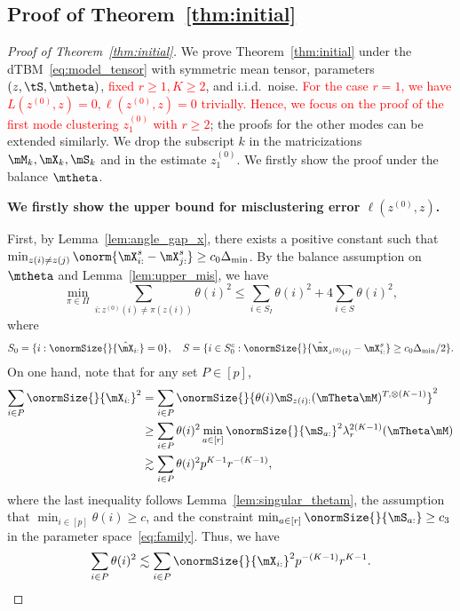 \documentclass[lettersize,onecolumn,journal]{IEEEtran}
\theoremstyle{definition}
\theoremstyle{definition}
\begin{document}
\subsection{Proof of Theorem~\ref{thm:initial}}
\begin{proof}[Proof of Theorem~\ref{thm:initial}] We prove Theorem~\ref{thm:initial} under the dTBM~\eqref{eq:model_tensor} with symmetric mean tensor, parameters $(z, \tS, \mtheta)$, \textcolor{red}{fixed $r\geq 1, K \geq 2$}, and i.i.d.\ noise. \textcolor{red}{For the case $r = 1$, we have $L(z^{(0)},z) = 0, \ell(z^{(0)}, z) = 0$ trivially. Hence, we focus on the proof of the first mode clustering $z^{(0)}_1$ with $r \geq 2$}; the proofs for the other modes can be extended similarly. We drop the subscript $k$ in the matricizations $\mM_k, \mX_k, \mS_k$ and in the estimate $z^{(0)}_1$. We firstly show the proof under the balance $\mtheta$.

\textbf{We firstly show the upper bound for misclustering error $\ell(z^{(0)}, z)$.}

First, by Lemma~\ref{lem:angle_gap_x}, there exists a positive constant such that $\min_{z(i) \neq z(j)} \onorm{ \mX^s_{i:} - \mX^s_{j:} } \geq c_0  \Delta_{\min}$. By the balance assumption on $\mtheta$ and Lemma~\ref{lem:upper_mis}, we have 
 \begin{equation}\label{eq:theta_bound}
          \min_{\pi \in \Pi} \sum_{i : z^{(0)}(i) \neq \pi(z(i))} \theta(i)^2  \leq  \sum_{i \in S_I} \theta(i)^2 + 4 \sum_{i \in S} \theta(i)^2 ,
    \end{equation}
    where 
    \begin{equation}
        S_0 = \{i: \onormSize{}{\hat \mX_{i:}} = 0\}, \quad S = \{i \in S_0^c: \onormSize{}{\hat \mx_{z^{(0)}(i)} - \mX_{i:}^s } \geq c_0  \Delta_{\min}/2\}.
    \end{equation}
    On one hand, note that for any set $P \in [p]$,
    \begin{align}
        \sum_{i \in P} \onormSize{}{\mX_{i:}}^2 &= \sum_{i \in P} \onormSize{}{ \theta(i) \mS_{z(i):} (\mTheta \mM)^{T, \otimes (K-1)} }^2 \\
        & \geq \sum_{i \in P} \theta(i)^2 \min_{a \in [r]} \onormSize{}{\mS_{a:}}^2 \lambda_{r}^{2(K-1)} (\mTheta \mM)\\
        & \gtrsim \sum_{i \in P} \theta(i)^2 p^{K-1} r^{-(K-1)}, 
    \end{align}
    where the last inequality follows Lemma~\ref{lem:singular_thetam}, the assumption that $\min_{i \in [p]} \theta(i) \geq c$, and the constraint $\min_{a \in [r]} \onormSize{}{\mS_{a:}} \geq c_3$ in the parameter space~\eqref{eq:family}. Thus, we have 
    \begin{equation}\label{eq:theta_p}
        \sum_{i \in P} \theta(i)^2 \lesssim \sum_{i \in P} \onormSize{}{\mX_{i:}}^2 p^{-(K-1)} r^{K-1}.
    \end{equation}
    

\end{proof}
\end{document}
